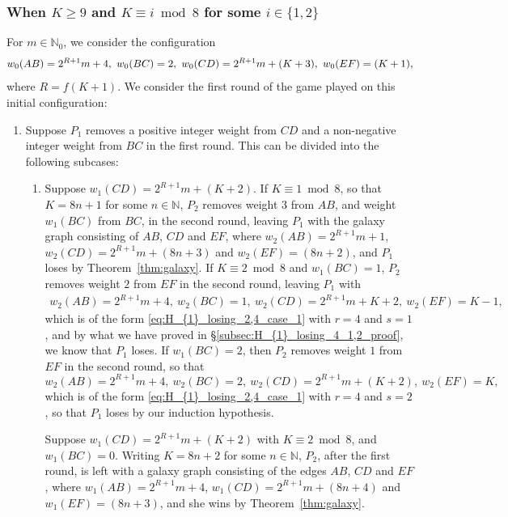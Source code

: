 \documentclass[11pt,reqno]{amsart}
\theoremstyle{definition}
\theoremstyle{definition}
\begin{document}
\subsubsection{When $K \geqslant 9$ and $K \equiv i \bmod 8$ for some $i \in \{1,2\}$}\label{subsubsec:H_{1}_losing_4_4}
For $m \in \mathbb{N}_{0}$, we consider the configuration
\begin{align}
w_{0}(AB)=2^{R+1}m+4,\ w_{0}(BC)=2,\ w_{0}(CD)=2^{R+1}m+(K+3),\ w_{0}(EF)=(K+1),\label{eq:H_{1}_losing_4_4_inductive}
\end{align}
where $R=f(K+1)$. We consider the first round of the game played on this initial configuration:
\begin{enumerate}
\item Suppose $P_{1}$ removes a positive integer weight from $CD$ and a non-negative integer weight from $BC$ in the first round. This can be divided into the following subcases:
\begin{enumerate}
\item Suppose $w_{1}(CD)=2^{R+1}m+(K+2)$. If $K\equiv 1 \bmod 8$, so that $K=8n+1$ for some $n \in \mathbb{N}$, $P_{2}$ removes weight $3$ from $AB$, and weight $w_{1}(BC)$ from $BC$, in the second round, leaving $P_{1}$ with the galaxy graph consisting of $AB$, $CD$ and $EF$, where $w_{2}(AB)=2^{R+1}m+1$, $w_{2}(CD)=2^{R+1}m+(8n+3)$ and $w_{2}(EF)=(8n+2)$, and $P_{1}$ loses by Theorem~\ref{thm:galaxy}. If $K \equiv 2 \bmod 8$ and $w_{1}(BC)=1$, $P_{2}$ removes weight $2$ from $EF$ in the second round, leaving $P_{1}$ with
\begin{align}
w_{2}(AB)=2^{R+1}m+4,\ w_{2}(BC)=1,\ w_{2}(CD)=2^{R+1}m+K+2,\ w_{2}(EF)=K-1,\nonumber
\end{align}
which is of the form \eqref{eq:H_{1}_losing_2,4_case_1} with $r=4$ and $s=1$, and by what we have proved in \S\ref{subsec:H_{1}_losing_4_1,2_proof}, we know that $P_{1}$ loses. If $w_{1}(BC)=2$, then $P_{2}$ removes weight $1$ from $EF$ in the second round, so that 
\begin{equation}
w_{2}(AB)=2^{R+1}m+4,\ w_{2}(BC)=2,\ w_{2}(CD)=2^{R+1}m+(K+2),\ w_{2}(EF)=K,\nonumber
\end{equation}
which is of the form \eqref{eq:H_{1}_losing_2,4_case_1} with $r=4$ and $s=2$, so that $P_{1}$ loses by our induction hypothesis.

Suppose $w_{1}(CD)=2^{R+1}m+(K+2)$ with $K \equiv 2 \bmod 8$, and $w_{1}(BC)=0$. Writing $K=8n+2$ for some $n \in \mathbb{N}$, $P_{2}$, after the first round, is left with a galaxy graph consisting of the edges $AB$, $CD$ and $EF$, where $w_{1}(AB)=2^{R+1}m+4$, $w_{1}(CD)=2^{R+1}m+(8n+4)$ and $w_{1}(EF)=(8n+3)$, and she wins by Theorem~\ref{thm:galaxy}.


\end{enumerate}
\end{enumerate}
\end{document}
